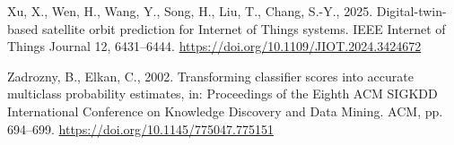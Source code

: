 \documentclass[
]{article}
\newlength{\cslhangindent}
\newenvironment{CSLReferences}[2] %
 {\begin{list}{}{%
  \setlength{\itemindent}{0pt}
  \setlength{\leftmargin}{0pt}
  \setlength{\parsep}{0pt}
  \ifodd #1
   \setlength{\leftmargin}{\cslhangindent}
   \setlength{\itemindent}{-1\cslhangindent}
  \fi
  \setlength{\itemsep}{#2\baselineskip}}}
 {\end{list}}
\begin{document}
\begin{CSLReferences}{1}{0}
Xu, X., Wen, H., Wang, Y., Song, H., Liu, T., Chang, S.-Y., 2025.
Digital-twin-based satellite orbit prediction for {Internet of Things}
systems. IEEE Internet of Things Journal 12, 6431--6444.
\url{https://doi.org/10.1109/JIOT.2024.3424672}

Zadrozny, B., Elkan, C., 2002. Transforming classifier scores into
accurate multiclass probability estimates, in: Proceedings of the Eighth
ACM SIGKDD International Conference on Knowledge Discovery and Data
Mining. ACM, pp. 694--699. \url{https://doi.org/10.1145/775047.775151}

\end{CSLReferences}
\end{document}

